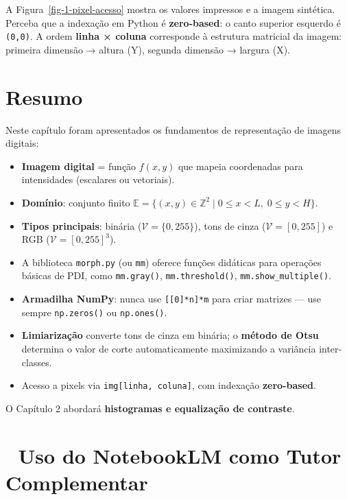 \documentclass[
  portuguese,
  letterpaper,
  openany,
  oneside,
  12pt,
  a4paper]{book}
\providecommand{\tightlist}{%
  \setlength{\itemsep}{0pt}\setlength{\parskip}{0pt}}
\begin{document}
A Figura~\ref{fig-1-pixel-acesso} mostra os valores impressos e a imagem
sintética. Perceba que a indexação em Python é \textbf{zero‑based}: o
canto superior esquerdo é \texttt{(0,0)}. A ordem \textbf{linha ×
coluna} corresponde à estrutura matricial da imagem: primeira dimensão →
altura (Y), segunda dimensão → largura (X).

\section{Resumo}\label{resumo}

Neste capítulo foram apresentados os fundamentos de representação de
imagens digitais:

\begin{itemize}
\tightlist
\item
  \textbf{Imagem digital} = função \(f(x,y)\) que mapeia coordenadas
  para intensidades (escalares ou vetoriais).
\item
  \textbf{Domínio}: conjunto finito
  \(\mathbb{E} = \{(x,y) \in \mathbb{Z}^2 \mid 0 \le x < L,\; 0 \le y < H\}\).
\item
  \textbf{Tipos principais}: binária (\(\mathcal{V} = \{0, 255\}\)),
  tons de cinza (\(\mathcal{V} = [0,255]\)) e RGB
  (\(\mathcal{V} = [0,255]^3\)).
\item
  A biblioteca \texttt{morph.py} (ou \texttt{mm}) oferece funções
  didáticas para operações básicas de PDI, como \texttt{mm.gray()},
  \texttt{mm.threshold()}, \texttt{mm.show\_multiple()}.
\item
  \textbf{Armadilha NumPy}: nunca use \texttt{{[}{[}0{]}*n{]}*m} para
  criar matrizes --- use sempre \texttt{np.zeros()} ou
  \texttt{np.ones()}.
\item
  \textbf{Limiarização} converte tons de cinza em binária; o
  \textbf{método de Otsu} determina o valor de corte automaticamente
  maximizando a variância inter-classes.
\item
  Acesso a pixels via \texttt{img{[}linha,\ coluna{]}}, com indexação
  \textbf{zero-based}.
\end{itemize}

O Capítulo 2 abordará \textbf{histogramas e equalização de contraste}.

\section{🤖 Uso do NotebookLM como Tutor
Complementar}\label{uso-do-notebooklm-como-tutor-complementar}
\end{document}
